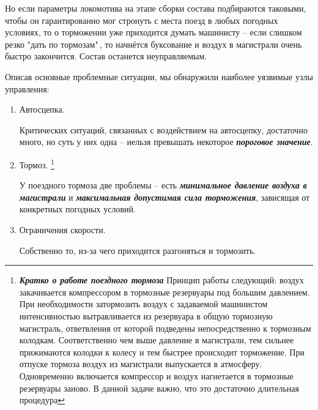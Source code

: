 \begin{itemize}
\begin{enumerate}
Но если параметры локомотива на этапе сборки состава подбираются таковыми, чтобы он гарантированно мог стронуть с места поезд в любых погодных условиях, то о торможении уже приходится думать машинисту -- если слишком резко "дать по тормозам"\,, то начнётся буксование и воздух в магистрали очень быстро закончится. Состав останется неуправляемым.
\end{enumerate}

Описав основные проблемные ситуации, мы обнаружили наиболее уязвимые узлы управления:
\begin{enumerate}
\item Автосцепка.

Критических ситуаций, связанных с воздействием на автосцепку, достаточно много, но суть у них одна -- нельзя превышать некоторое \textbf{\textit{пороговое значение}}.

\item Тормоз.
\footnote{\textbf{\textit{Кратко о работе поездного тормоза}} Принцип работы следующий: воздух закачивается компрессором в тормозные резервуары под большим давлением. При необходимости затормозить воздух с задаваемой машинистом интенсивностью вытравливается из резервуара в общую тормозную магистраль, ответвления от которой подведены непосредственно к тормозным колодкам. Соответственно чем выше давление в магистрали, тем сильнее прижимаются колодки к колесу и тем быстрее происходит торможение. При отпуске тормоза воздух из магистрали выпускается в атмосферу. Одновременно включается компрессор и воздух нагнетается в тормозные резервуары заново. В данной задаче важно, что это достаточно длительная процедура}

У поездного тормоза две проблемы -- есть \textbf{\textit{минимальное давление воздуха в магистрали}} и \textbf{\textit{максимальная допустимая сила торможения}}, зависящая от конкретных погодных условий.

\item Ограничения скорости. 

Собственно то, из-за чего приходится разгоняться и тормозить.

\end{enumerate}

\end{itemize}
